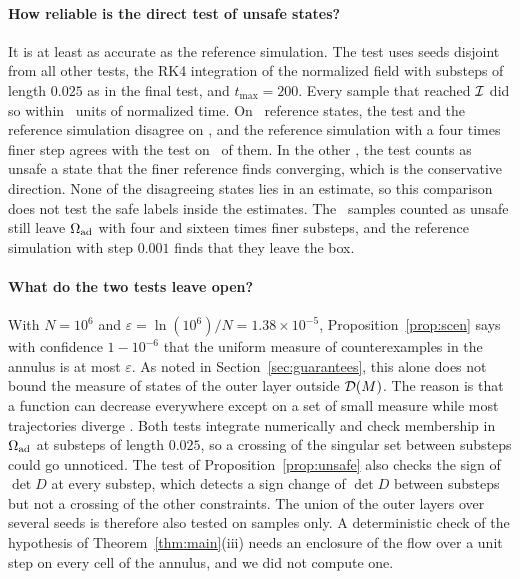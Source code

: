 


\paragraph{How reliable is the direct test of unsafe states?} It is at least as accurate as the reference simulation. The test uses seeds disjoint from all other tests, the RK4 integration of the normalized field with substeps of length $0.025$ as in the final test, and $t_{\max}=200$. Every sample that reached $\mathcal I$ did so within \resUnsafeTimeMax\ units of normalized time. On \resUnsafeCmp\ reference states, the test and the reference simulation disagree on \resUnsafeDis, and the reference simulation with a four times finer step agrees with the test on \resUnsafeAgree\ of them. In the other \resUnsafeCons, the test counts as unsafe a state that the finer reference finds converging, which is the conservative direction. None of the disagreeing states lies in an estimate, so this comparison does not test the safe labels inside the estimates. The \resUnsafeTotal\ samples counted as unsafe still leave $\Omega_{\mathrm{ad}}$ with four and sixteen times finer substeps, and the reference simulation with step $0.001$ finds that they leave the box.

\paragraph{What do the two tests leave open?} With $N=10^6$ and $\varepsilon=\ln(10^6)/N=1.38\times10^{-5}$, Proposition~\ref{prop:scen} says with confidence $1-10^{-6}$ that the uniform measure of counterexamples in the annulus is at most $\varepsilon$. As noted in Section~\ref{sec:guarantees}, this alone does not bound the measure of states of the outer layer outside $\mathcal D(M)$. The reason is that a function can decrease everywhere except on a set of small measure while most trajectories diverge \citep{kenanian2019}. Both tests integrate numerically and check membership in $\Omega_{\mathrm{ad}}$ at substeps of length $0.025$, so a crossing of the singular set between substeps could go unnoticed. The test of Proposition~\ref{prop:unsafe} also checks the sign of $\det D$ at every substep, which detects a sign change of $\det D$ between substeps but not a crossing of the other constraints. The union of the outer layers over several seeds is therefore also tested on samples only. A deterministic check of the hypothesis of Theorem~\ref{thm:main}(iii) needs an enclosure of the flow over a unit step on every cell of the annulus, and we did not compute one.

